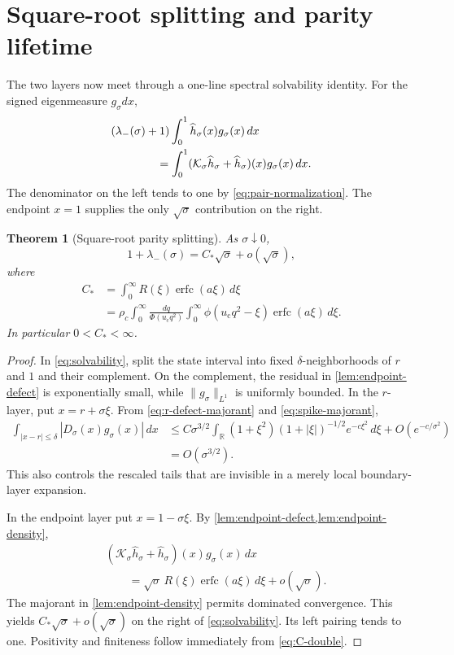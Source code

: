 \documentclass[11pt]{article}
\newtheorem{theorem}{Theorem}[section]
\theoremstyle{definition}
\theoremstyle{remark}
\newcommand{\R}{\mathbb R}
\newcommand{\uc}{u_{\mathrm c}}
\newcommand{\cK}{\mathcal K}
\newcommand{\erfcop}{\operatorname{erfc}}
\begin{document}
\section{Square-root splitting and parity lifetime}
\label{sec:main-theorem}

The two layers now meet through a one-line spectral solvability identity.
For the signed eigenmeasure $g_\sigma dx$,
\begin{align}
 &(\lambda_-(\sigma)+1)
 \int_0^1\widehat h_\sigma(x)g_\sigma(x)\,dx
 \notag\\
 &\hspace{4em}=
 \int_0^1
 (\cK_\sigma\widehat h_\sigma+\widehat h_\sigma)(x)
 g_\sigma(x)\,dx.
 \label{eq:solvability}
\end{align}
The denominator on the left tends to one by
\eqref{eq:pair-normalization}.  The endpoint $x=1$ supplies the only
$\sqrt\sigma$ contribution on the right.

\begin{theorem}[Square-root parity splitting]
\label{thm:square-root}
As $\sigma\downarrow0$,
\begin{equation}\label{eq:main-law}
 \boxed{
  1+\lambda_-(\sigma)
  =C_*\sqrt\sigma+o(\sqrt\sigma),}
\end{equation}
where
\begin{align}
 C_*
 &=\int_0^\infty R(\xi)\erfcop(a\xi)\,d\xi
 \label{eq:C-first}\\
 &=\rho_c\int_0^\infty\frac{dq}{\Phi(\uc q^2)}
 \int_0^\infty
 \phi(\uc q^2-\xi)\erfcop(a\xi)\,d\xi.
 \label{eq:C-double}
\end{align}
In particular $0<C_*<\infty$.
\end{theorem}

\begin{proof}
In \eqref{eq:solvability}, split the state interval into fixed
$\delta$-neighborhoods of $r$ and $1$ and their complement.  On the
complement, the residual in \cref{lem:endpoint-defect} is exponentially
small, while $\|g_\sigma\|_{L^1}$ is uniformly bounded.  In the $r$-layer,
put $x=r+\sigma\xi$.  From \eqref{eq:r-defect-majorant} and
\eqref{eq:spike-majorant},
\begin{align*}
 \int_{|x-r|\le\delta}|D_\sigma(x)g_\sigma(x)|\,dx
 &\le C\sigma^{3/2}
 \int_{\R}(1+\xi^2)(1+|\xi|)^{-1/2}e^{-c\xi^2}\,d\xi
  +O(e^{-c/\sigma^2})\\
 &=O(\sigma^{3/2}).
\end{align*}
This also controls the rescaled tails that are invisible in a merely local
boundary-layer expansion.

In the endpoint layer put $x=1-\sigma\xi$.  By
\cref{lem:endpoint-defect,lem:endpoint-density},
\begin{align*}
 &(\cK_\sigma\widehat h_\sigma+\widehat h_\sigma)(x)
 g_\sigma(x)\,dx\\
 &\qquad=
 \sqrt\sigma\,
 R(\xi)\erfcop(a\xi)\,d\xi+o(\sqrt\sigma).
\end{align*}
The majorant in \cref{lem:endpoint-density} permits dominated convergence.
This yields $C_*\sqrt\sigma+o(\sqrt\sigma)$ on the right of
\eqref{eq:solvability}.  Its left pairing tends to one.  Positivity and
finiteness follow immediately from \eqref{eq:C-double}.
\end{proof}
\end{document}
